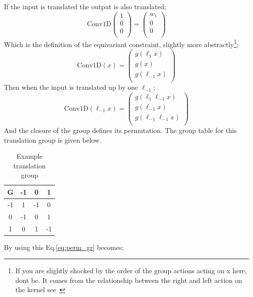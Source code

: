 If the input is translated the output is also translated;
\begin{equation}
	\text{Conv1D}\begin{pmatrix}
		1 \\
		0 \\
		0 \\
	\end{pmatrix}
	= \begin{pmatrix}
		w_1 \\
		0   \\
		0   \\
	\end{pmatrix}
\end{equation}
Which is the definition of the equivariant constraint, slightly more abstractly\footnote{If you are slightly shocked by the order of the group actions acting on x here, dont be. It comes from the relationship between the right and left action on the kernel see~\cite{cohen2016group}};
\begin{equation}
	\text{Conv1D}(x) = \begin{pmatrix}
		g(\ell_{1}x)   \\
		g(x)           \\
		g(\ell_{-1} x) \\
	\end{pmatrix}
\end{equation}
Then when the input is translated up by one $\ell_{-1}$;
\begin{equation}\label{eq:perm_gr}
	\text{Conv1D}(\ell_{-1} x) = \begin{pmatrix}
		g(\ell_{1}\ell_{-1}x)   \\
		g(\ell_{-1}x)           \\
		g(\ell_{-1}\ell_{-1} x) \\
	\end{pmatrix}
\end{equation}
And the closure of the group defines its permutation. The group table for this translation group is given below.
\begin{table}[h]
	\centering
	\begin{tabular}{|c| c c c|}
		\hline
		G  & -1 & 0  & 1  \\
		\hline
		-1 & 1  & -1 & 0  \\
		0  & -1 & 0  & 1  \\
		1  & 0  & 1  & -1 \\
		\hline
	\end{tabular}
	\caption{Example translation group}
\end{table}
By using this Eq.\ref{eq:perm_gr} becomes;


